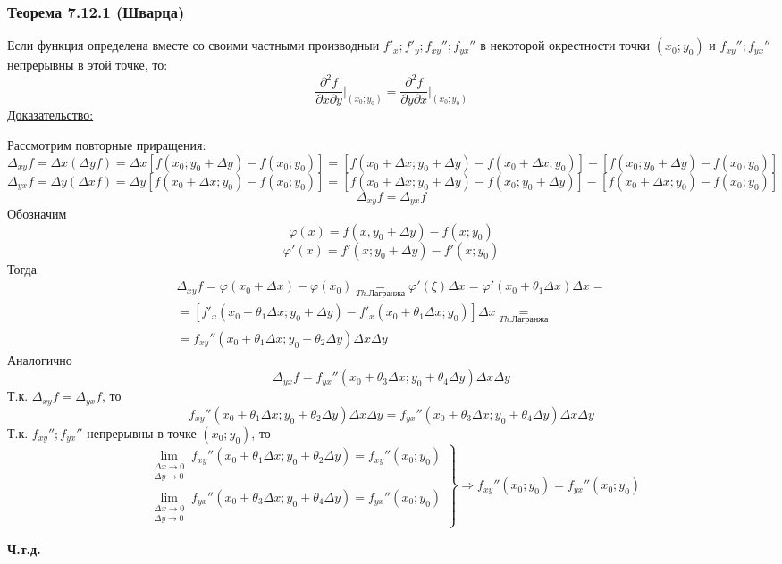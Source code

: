 \documentclass[12pt]{article}
\begin{document}
    \subsubsection*{Теорема 7.12.1 (Шварца)}\label{th:7.12.1}
    Если функция определена вместе со своими частными производныи $f'_x; f'_y; f_{xy}''; f_{yx}''$ в некоторой окрестности точки $(x_0; y_0)$ и \underline{$f_{xy}''; f_{yx}''$ непрерывны} в этой точке, то:
    \[ \frac{\partial^2 f}{\partial x \partial y} \Big|_{(x_0; y_0)} = \frac{\partial^2 f}{\partial y \partial x} \Big|_{(x_0; y_0)} \]
    \underline{Доказательство:}
    \begin{adjustwidth}{1.5em}{1.5em}
        Рассмотрим повторные приращения:
        \[ \Delta_{xy} f = \Delta x (\Delta y f) = \Delta x [ f(x_0; y_0 + \Delta y) - f(x_0; y_0) ] = [ f(x_0 + \Delta x; y_0 + \Delta y) - f(x_0 + \Delta x; y_0) ] - [ f(x_0; y_0 + \Delta y) - f(x_0; y_0) ] \]
        \[ \Delta_{yx} f = \Delta y (\Delta x f) = \Delta y [ f(x_0 + \Delta x; y_0) - f(x_0; y_0) ] = [ f(x_0 + \Delta x; y_0 + \Delta y) - f(x_0; y_0 + \Delta y) ] - [ f(x_0 + \Delta x; y_0) - f(x_0; y_0) ] \]
        \[ \Delta_{xy}f = \Delta_{yx}f \]
        Обозначим
        \[ \varphi(x) = f(x, y_0 + \Delta y) - f(x; y_0) \]
        \[ \varphi'(x) = f'(x; y_0 + \Delta y) - f'(x;y_0) \]
        Тогда
        \begin{gather*}
            \Delta_{xy}f = \varphi (x_0 + \Delta x) - \varphi(x_0) \underset{\hyperref[th:4.12.4]{Th. Лагранжа}}{=} \varphi'(\xi)\Delta x = \varphi'(x_0 + \theta_1 \Delta x)\Delta x =\\
            = [ f'_x(x_0 + \theta_1 \Delta x; y_0 + \Delta y) - f'_x(x_0 + \theta_1 \Delta x; y_0) ] \Delta x \underset{\hyperref[th:4.12.4]{Th. Лагранжа}}{=}\\
            = f_{xy}''(x_0 + \theta_1 \Delta x; y_0 + \theta_2 \Delta y)\Delta x \Delta y
        \end{gather*}
        Аналогично 
        \[ \Delta_{yx}f = f_{yx}''(x_0 + \theta_3 \Delta x; y_0 + \theta_4 \Delta y)\Delta x \Delta y \]
        Т.к. $\Delta_{xy}f = \Delta_{yx}f$, то
        \[ f_{xy}''(x_0 + \theta_1 \Delta x; y_0 + \theta_2 \Delta y)\Delta x \Delta y = f_{yx}''(x_0 + \theta_3 \Delta x; y_0 + \theta_4 \Delta y)\Delta x \Delta y \]
        Т.к. $f_{xy}''; f_{yx}''$ непрерывны в точке $(x_0; y_0)$, то
        \[ \left.\begin{aligned}
            \lim_{\substack{\Delta x \to 0 \\ \Delta y \to 0}} f_{xy}'' (x_0 + \theta_1 \Delta x; y_0 + \theta_2 \Delta y) = f_{xy}'' (x_0; y_0)\\
            \lim_{\substack{\Delta x \to 0 \\ \Delta y \to 0}} f_{yx}'' (x_0 + \theta_3 \Delta x; y_0 + \theta_4 \Delta y) = f_{yx}'' (x_0; y_0)
        \end{aligned}\right\rbrace \Rightarrow f_{xy}'' (x_0; y_0) = f_{yx}''(x_0; y_0) \]
        \begin{center}
            \textbf{Ч.т.д.}
        \end{center}
    \end{adjustwidth}
\end{document}
